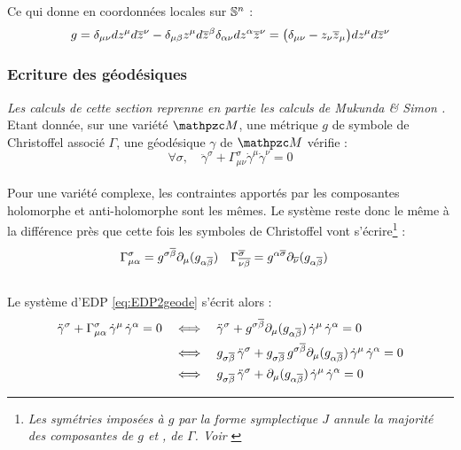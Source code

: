 Ce qui donne en coordonnées locales sur $\S{n}$ : 
\[g = \delta_{\mu \nu} dz^\mu d\congu{z}^\nu - \delta_{\mu \beta}z^\mu d\congu{z}^\beta \delta_{\alpha \nu} dz^\alpha \congu{z}^\nu = \big( \delta_{\mu \nu} - z_\nu \congu{z}_\mu \big) dz^\mu d\congu{z}^\nu\]
\skipl





\subsubsection{Ecriture des géodésiques}

\textit{Les calculs de cette section reprenne en partie les calculs de Mukunda \& Simon \cite[sec. 4, p. 219]{mukunda_quantum_1993}.}
\\

Etant donnée, sur une variété $\manu$, une métrique $g$ de symbole de Christoffel associé $\Gamma$, une géodésique $\gamma$ de $\manu$ vérifie \cite{do_carmo_riemannian_1992} :
\begin{equation}\label{eq:EDP2geode}
	\forall \sigma,\quad \ddot{\gamma}^\sigma + \Gamma^\sigma _{\mu \nu} \dot{\gamma}^\mu \dot{\gamma}^\nu = 0
\end{equation}
\\
Pour une variété complexe, les contraintes apportés par les composantes holomorphe  et anti-holomorphe  sont les mêmes. Le système reste donc le même à la différence près que cette fois les symboles de Christoffel vont s'écrire\footnote{\itshape
	Les symétries imposées à $g$ par la forme symplectique $J$ annule la majorité des composantes de $g$ et \afortiori, de $\Gamma$. Voir \cite[sec. 8.4.3]{nakahara_geometry_2003}
} :
\begin{align}\label{eq:symb2Christo}
	\Gamma^\sigma _{\mu \alpha} &= g^{\sigma \congu{\beta}} \partial_{\mu} (g_{\alpha \congu{\beta}})  &  \Gamma^{\congu{\sigma}} _{\congu{\nu \beta}} &= g^{\alpha \congu{\sigma}} \partial_{\congu{\nu}} (g_{\alpha \congu{\beta}}) 
\end{align}
\\
Le système d'EDP \eqref{eq:EDP2geode} s'écrit alors :
\begin{align*}
	\ddot{\gamma}^\sigma + \Gamma^\sigma _{\mu \alpha}\,  \dot{\gamma}^\mu\, \dot{\gamma}^\alpha = 0 
	\quad &\Llr\quad
	\ddot{\gamma}^\sigma + g^{\sigma \congu{\beta}} \partial_{\mu} (g_{\alpha \congu{\beta}}) \, \dot{\gamma}^\mu\, \dot{\gamma}^\alpha = 0 \\
	&\Llr\quad 
	g_{\sigma \congu{\beta}}\, \ddot{\gamma}^\sigma + g_{\sigma \congu{\beta}}\, g^{\sigma \congu{\beta}} \partial_{\mu} (g_{\alpha \congu{\beta}}) \, \dot{\gamma}^\mu\, \dot{\gamma}^\alpha = 0 \\
	&\Llr\quad 
	g_{\sigma \congu{\beta}}\, \ddot{\gamma}^\sigma + \partial_{\mu} (g_{\alpha \congu{\beta}}) \, \dot{\gamma}^\mu\, \dot{\gamma}^\alpha = 0
\end{align*}
